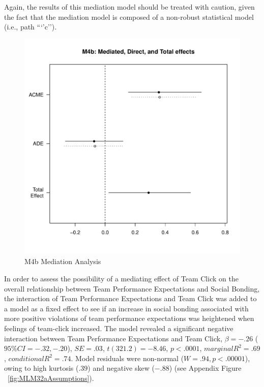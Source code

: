   Again, the results of this mediation model should be treated with caution, given the fact that the mediation model is composed of a non-robust statistical model (i.e., path ```'c'').

  \begin{figure}[htbp]
    \centering
    \includegraphics[scale = .5]{images/MLM4bMediationEffects.pdf}
    \caption{M4b Mediation Analysis}
    \label{fig:MLM4bMediationAnalysis}
  \end{figure}




In order to assess the possibility of a mediating effect of Team Click on the overall relationship between Team Performance Expectations and Social Bonding, the interaction of Team Performance Expectations and Team Click was added to a model as a fixed effect to see if an increase in social bonding associated with more positive violations of team performance expectations was heightened when feelings of team-click increased. The model revealed a significant negative interaction between Team Performance Expectations and Team Click,  $\beta = -.26$ ($95\% CI =  -.32, -.20$), $SE = .03$, $t(321.2) = -8.46$, $p < .0001$, $marginal R^2 = .69$, $conditional R^2 = .74$.  Model residuals were non-normal ($W = .94, p < .00001$), owing to high kurtosis ($.39$) and negative skew ($-.88$) (see Appendix Figure ~\ref{fig:MLM32aAssumptions}).

